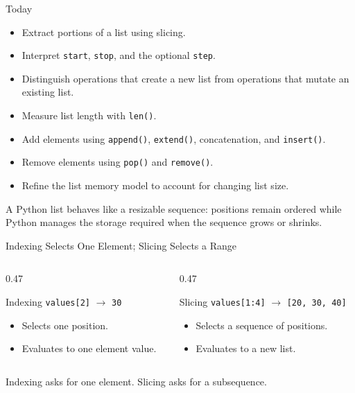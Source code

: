 \documentclass[aspectratio=169,10pt]{beamer}
\begin{document}
\makedecktitle

\begin{frame}{Today}
  \begin{itemize}
    \item Extract portions of a list using slicing.
    \item Interpret \texttt{start}, \texttt{stop}, and the optional \texttt{step}.
    \item Distinguish operations that create a new list from operations that mutate an existing list.
    \item Measure list length with \texttt{len()}.
    \item Add elements using \texttt{append()}, \texttt{extend()}, concatenation, and \texttt{insert()}.
    \item Remove elements using \texttt{pop()} and \texttt{remove()}.
    \item Refine the list memory model to account for changing list size.
  \end{itemize}

  \begin{keyidea}
    A Python list behaves like a resizable sequence: positions remain ordered while Python manages the storage required when the sequence grows or shrinks.
  \end{keyidea}
\end{frame}


\begin{frame}{Indexing Selects One Element; Slicing Selects a Range}
  \begin{columns}[T,onlytextwidth]
    \begin{column}{0.47\textwidth}
      \begin{block}{Indexing}
        \centering
        \texttt{values[2]} $\longrightarrow$ \texttt{30}
      \end{block}
      \begin{itemize}
        \item Selects one position.
        \item Evaluates to one element value.
      \end{itemize}
    \end{column}
    \begin{column}{0.47\textwidth}
      \begin{block}{Slicing}
        \centering
        \texttt{values[1:4]} $\longrightarrow$ \texttt{[20, 30, 40]}
      \end{block}
      \begin{itemize}
        \item Selects a sequence of positions.
        \item Evaluates to a new list.
      \end{itemize}
    \end{column}
  \end{columns}

  \begin{keyidea}
    Indexing asks for one element. Slicing asks for a subsequence.
  \end{keyidea}
\end{frame}
\end{document}
